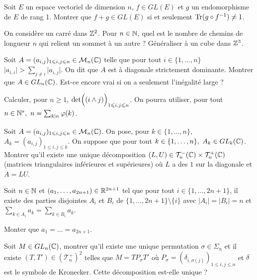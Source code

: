 \begin{exercise}
	Soit $E$ un espace vectoriel de dimension $n$, $f\in GL(E)$ et $g$ un
	endomorphisme de $E$ de rang 1. Montrer que $f+g\in GL(E)$ si et seulement
	$\operatorname{Tr}(g\circ f^{-1})\neq 1$.
\end{exercise}

\begin{exercise}
	On considère un carré dans $\mathbb{Z}^{2}$. Pour $n\in\mathbb{N}$, quel est le nombre de
	chemins de longueur $n$ qui relient un sommet à un autre ? Généraliser à un
	cube dans $\mathbb{Z}^{3}$.
\end{exercise}

\begin{exercise}
	Soit $A=(a_{i,j})_{1\leqslant i,j\leqslant n}\in\mathcal{M}_{n}(\mathbb{C})$ telle que pour
	tout $i\in\{1,\dots,n\}$$\vert a_{i,i}\vert>\sum_{j\neq i}\vert a_{i,j}\vert$.
	On dit que $A$ est à diagonale strictement dominante. Montrer que $A\in
	GL_{n}(\mathbb{C})$. Est-ce encore vrai si on a seulement l'inégalité large ?
\end{exercise}

\begin{exercise}
	Calculer, pour $n\geqslant1$, $\det\Bigl((i\wedge j)\Bigr)_{1\leqslant
	i,j\leqslant n}$. On pourra utiliser, pour tout $n\in\mathbb{N}^{*},~n=\sum_{k\mid
	n}\varphi(k)$.
\end{exercise}

\begin{exercise}
	Soit $A=(a_{i,j})_{1\leqslant i,j\leqslant n}\in\mathcal{M}_{n}(\mathbb{C})$. On pose, pour
	$k\in\{1,\dots, n\}$,$A_{k}=(a_{i,j})_{1\leqslant i,j\leqslant k}$. On suppose
	que pour tout $k\in\{1,\dots,n\},~A_{k}\in GL_{k}(\mathbb{C})$. Montrer qu'il existe
	une unique décomposition
	$(L,U)\in\mathcal{T}_{n}^{-}(\mathbb{C})\times\mathcal{T}_{n}^{+}(\mathbb{C})$ (matrices
	triangulaires inférieures et supérieures) où $L$ a des $1$ sur la diagonale et
	$A=LU$.
\end{exercise}

\begin{exercise}
	Soit $n\in\mathbb{N}$ et $(a_{1},\dots,a_{2n+1})\in\mathbb{R}^{2n+1}$ tel que pour tout
	$i\in\{1,\dots,2n+1\}$, il existe des parties disjointes $A_{i}$ et $B_{i}$ de
	$\{1,\dots,2n+1\}\setminus\{i\}$ avec $\vert A_{i}\vert=\vert B_{i}\vert=n$ et
	$\sum_{k\in A_{i}}a_{k}=\sum_{k\in B_{i}}a_{k}$.

	Monter que $a_{1}=\dots=a_{2n+1}$.
\end{exercise}

\begin{exercise}
	Soit $M\in GL_{n}(\mathbb{C})$, montrer qu'il existe une unique permutation
	$\sigma\in\Sigma_{n}$ et il existe $(T,T')\in(\mathcal{T}_{n}^{+})^{2}$ telles
	que $M=TP_{\sigma}T'$ où $P_{\sigma}=(\delta_{i,\sigma(j)})_{1\leqslant
	i,j\leqslant n}$ et $\delta$ est le symbole de Kronecker. Cette décomposition
	est-elle unique ?
\end{exercise}

